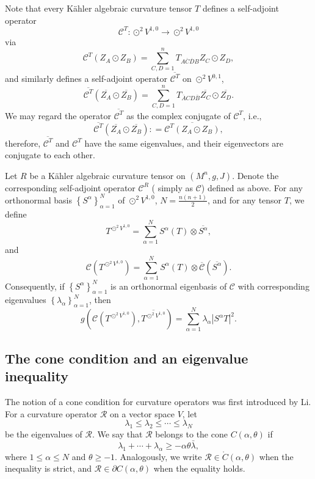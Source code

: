 \documentclass{amsart}
\theoremstyle{definition}
\theoremstyle{remark}
\numberwithin{equation}{section}
\begin{document}
Note that every K{\"a}hler algebraic curvature tensor $T$ defines a self-adjoint operator
 $${\mathcal{C}^T}\colon { \odot ^2}{V^{1,0}}\rightarrow { \odot ^2}{V^{1,0}}$$
 via
$${\mathcal{C}^T}\left( {{Z_A} \odot {Z_B}} \right) = \sum\limits_{C,D = 1}^n {{T_{A\overline C \overline D B}}{Z_C} \odot {Z_D}},$$
and similarly defines a self-adjoint operator $\overline{\mathcal{C}^T}$ on ${ \odot ^2}{V^{0,1}}$,
$$\overline {\mathcal{C}^T} \left( {\overline {{Z_A}}  \odot \overline {{Z_B}} } \right) = \sum\limits_{C,D = 1}^n {{T_{\overline A CD\overline B }}\overline {{Z_C}}  \odot \overline {{Z_D}} }. $$
We may regard the operator $\overline {\mathcal{C}^T}$ as the complex conjugate of ${\mathcal{C}^T}$, i.e.,
$$\overline {\mathcal{C}^T} \left( {\overline {{Z_A}}  \odot \overline {{Z_B}} } \right): = \overline {{\mathcal{C}^T}\left( {{Z_A} \odot {Z_B}} \right)},$$
 therefore, $\overline {\mathcal{C}^T}$ and ${\mathcal{C}^T}$ have the same eigenvalues, and their eigenvectors are conjugate to each other.

Let $R$ be a K{\"a}hler algebraic curvature tensor on $\left( M^n,g,J \right)$. Denote the corresponding self-adjoint operator ${\mathcal{C}^R}$ ( simply  as $\mathcal{C}$)  defined as above. For any orthonormal basis $\left\{ {{S^\alpha }} \right\}_{\alpha  = 1}^N$ of ${ \odot ^2}{V^{1,0}}$, $N = \frac{{n(n + 1)}}{2}$, and for any tensor $T$, we define
$${T^{{ \odot ^2}{V^{1,0}}}} = \sum\limits_{\alpha  = 1}^N {{S^\alpha }\left( T \right) \otimes \overline{S^\alpha }} ,$$
and
$$\mathcal{C}\left( {{T^{{ \odot ^2}{V^{1,0}}}}} \right) = \sum\limits_{\alpha  = 1}^N {{S^\alpha }\left( T \right) \otimes \overline {\mathcal{C}} \left( {\overline {{S^\alpha }} } \right)}.$$
Consequently, if $\left\{ {{S^\alpha }} \right\}_{\alpha  = 1}^N$ is an orthonormal eigenbasis of $\mathcal{C}$ with corresponding eigenvalues $\left\{ {{\lambda _\alpha }} \right\}_{\alpha  = 1}^N$, then
$$g\left( {\mathcal{C}\left( {{T^{{ \odot ^2}{V^{1,0}}}}} \right),\overline {{T^{{ \odot ^2}{V^{1,0}}}}} } \right) = \sum\limits_{\alpha  = 1}^N {{\lambda _\alpha }{{\left| {{S^\alpha }T} \right|}^2}}. $$

\subsection{The cone condition and an eigenvalue inequality}
The notion of a cone condition for curvature operators was first introduced by Li\cite{li2025new}. For a curvature operator $\mathcal{R}$ on a vector space $V$, let $${\lambda _1} \le {\lambda _2} \le  \cdots  \le {\lambda _N}$$ be the eigenvalues of $\mathcal{R}$. We say that $\mathcal{R}$ belongs to the cone $C\left( \alpha ,\theta \right)$ if
$${\lambda _1} +  \cdots  + {\lambda _\alpha } \ge  - \alpha \theta \bar \lambda ,$$
where $1 \le \alpha  \le N$ and $\theta  \ge  - 1$. Analogously, we write  $\mathcal{R} \in \mathring{C}\left( \alpha ,\theta \right)$ when the inequality is strict, and $\mathcal{R} \in \partial C\left( \alpha ,\theta \right)$ when the equality holds.
\end{document}

